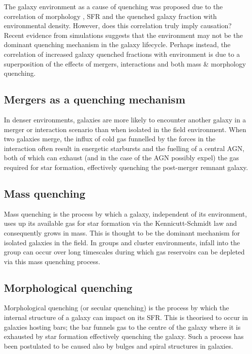 \documentclass[useAMS,usenatbib]{mn2e}
\begin{document}
 The galaxy environment as a cause of quenching was proposed due to the correlation of morphology \citep{dressler80, smail97, poggianti99, postman05, bamford09}, SFR and the quenched galaxy fraction \citep{kauffmann03, baldry06, peng12, darvish16} with environmental density. However, does this correlation truly imply causation? Recent evidence from simulations  suggests that the environment may not be the dominant quenching mechanism in the galaxy lifecycle. Perhaps instead, the correlation of increased galaxy quenched fractions with environment is due to a superposition of the effects of mergers, interactions and both mass \& morphology quenching. 
 
\subsection{Mergers as a quenching mechanism}
In denser environments, galaxies are more likely to encounter another galaxy in a merger or interaction scenario than when isolated in the field environment. When two galaxies merge, the influx of cold gas funnelled by the forces in the interaction often result in energetic starbursts and the fuelling of a central AGN, both of which can exhaust  (and in the case of the AGN possibly expel) the gas required for star formation, effectively quenching the post-merger remnant galaxy. 

\subsection{Mass quenching}
Mass quenching is the process by which a galaxy, independent of its environment, uses up its available gas for star formation via the Kennicutt-Schmidt law \citep{schmidt59, kennicutt98} and consequently grows in mass. This is thought to be the dominant mechanism for isolated galaxies in the field. In groups and cluster environments, infall into the group can occur over long timescales during which gas reservoirs can be depleted via this mass quenching process.
 
\subsection{Morphological quenching}
Morphological quenching (or secular quenching) is the process by which the internal structure of a galaxy can impact on its SFR. This is theorised to occur in galaxies hosting bars; the bar funnels gas to the centre of the galaxy where it is exhausted by star formation effectively quenching the galaxy. Such a process has been postulated to be caused also by bulges \citep{} and spiral \citep{} structures in galaxies. 
  
\end{document}
